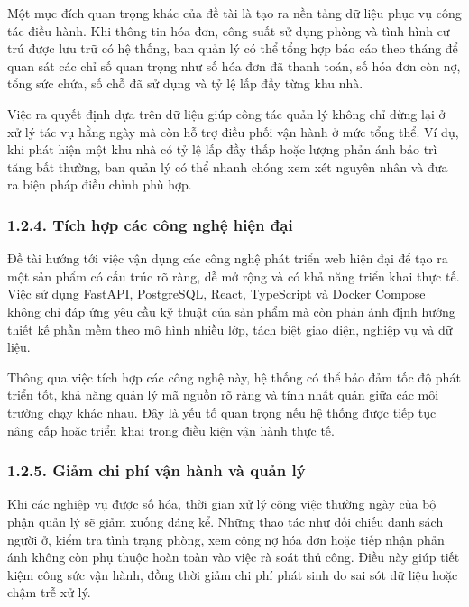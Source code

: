 \documentclass[12pt]{article}
\begin{document}
Một mục đích quan trọng khác của đề tài là tạo ra nền tảng dữ liệu phục vụ công tác điều hành. Khi thông tin hóa đơn, công suất sử dụng phòng và tình hình cư trú được lưu trữ có hệ thống, ban quản lý có thể tổng hợp báo cáo theo tháng để quan sát các chỉ số quan trọng như số hóa đơn đã thanh toán, số hóa đơn còn nợ, tổng sức chứa, số chỗ đã sử dụng và tỷ lệ lấp đầy từng khu nhà.

Việc ra quyết định dựa trên dữ liệu giúp công tác quản lý không chỉ dừng lại ở xử lý tác vụ hằng ngày mà còn hỗ trợ điều phối vận hành ở mức tổng thể. Ví dụ, khi phát hiện một khu nhà có tỷ lệ lấp đầy thấp hoặc lượng phản ánh bảo trì tăng bất thường, ban quản lý có thể nhanh chóng xem xét nguyên nhân và đưa ra biện pháp điều chỉnh phù hợp.

\subsubsection*{1.2.4. Tích hợp các công nghệ hiện đại}

Đề tài hướng tới việc vận dụng các công nghệ phát triển web hiện đại để tạo ra một sản phẩm có cấu trúc rõ ràng, dễ mở rộng và có khả năng triển khai thực tế. Việc sử dụng FastAPI, PostgreSQL, React, TypeScript và Docker Compose không chỉ đáp ứng yêu cầu kỹ thuật của sản phẩm mà còn phản ánh định hướng thiết kế phần mềm theo mô hình nhiều lớp, tách biệt giao diện, nghiệp vụ và dữ liệu.

Thông qua việc tích hợp các công nghệ này, hệ thống có thể bảo đảm tốc độ phát triển tốt, khả năng quản lý mã nguồn rõ ràng và tính nhất quán giữa các môi trường chạy khác nhau. Đây là yếu tố quan trọng nếu hệ thống được tiếp tục nâng cấp hoặc triển khai trong điều kiện vận hành thực tế.

\subsubsection*{1.2.5. Giảm chi phí vận hành và quản lý}

Khi các nghiệp vụ được số hóa, thời gian xử lý công việc thường ngày của bộ phận quản lý sẽ giảm xuống đáng kể. Những thao tác như đối chiếu danh sách người ở, kiểm tra tình trạng phòng, xem công nợ hóa đơn hoặc tiếp nhận phản ánh không còn phụ thuộc hoàn toàn vào việc rà soát thủ công. Điều này giúp tiết kiệm công sức vận hành, đồng thời giảm chi phí phát sinh do sai sót dữ liệu hoặc chậm trễ xử lý.
\end{document}
